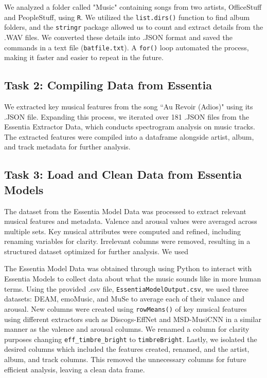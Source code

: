 \documentclass{article}\usepackage[]{graphicx}\usepackage[]{xcolor}
\begin{document}
\begin{multicols}{2}
We analyzed a folder called "Music" containing songs from two artists, OfficeStuff and PeopleStuff, using \texttt{R}. We utilized the \texttt{list.dirs()} function to find album folders, and the \texttt{stringr} package\citep{Wickham} allowed us to count and extract details from the .WAV files. We converted these details into .JSON format and saved the commands in a text file (\texttt{batfile.txt}). A \texttt{for()} loop automated the process, making it faster and easier to repeat in the future.

\subsection{Task 2: Compiling Data from Essentia}
We extracted key musical features from the song ``Au Revoir (Adios)" using its .JSON file. Expanding this process, we iterated over 181 .JSON files from the Essentia Extractor Data, which conducts spectrogram analysis on music tracks. The extracted features were compiled into a dataframe alongside artist, album, and track metadata for further analysis.

\subsection{Task 3: Load and Clean Data from Essentia Models}
The dataset from the Essentia Model Data was processed to extract relevant musical features and metadata. Valence and arousal values were averaged across multiple sets. Key musical attributes were computed and refined, including renaming variables for clarity. Irrelevant columns were removed, resulting in a structured dataset optimized for further analysis. We used 

The Essentia Model Data was obtained through using Python to interact with Essentia Models to collect data about what the music sounds like in more human terms. Using the provided .csv file, \texttt{EssentiaModelOutput.csv}, we used three datasets: DEAM, emoMusic, and MuSe to average each of their valance and arousal. New columns were created using \texttt{rowMeans()} of key musical features using different extractors such as Discogs-EffNet and MSD-MusiCNN in a similar manner as the valence and arousal columns. We renamed a column for clarity purposes changing \texttt{eff\_timbre\_bright} to \texttt{timbreBright}. Lastly, we isolated the desired columns which included the features created, renamed, and the artist, album, and track columns. This removed the unnecessary columns for future efficient analysis, leaving a clean data frame. 


\end{multicols}
\end{document}
